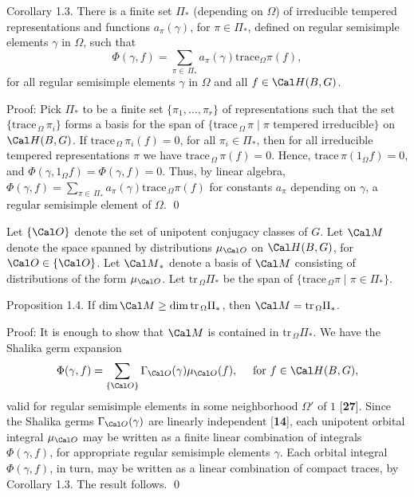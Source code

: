 \proclaim Corollary {1.3}.
There is a finite set
  $ \Pi_* $ (depending on $\Omega$)
of irreducible tempered representations and functions
  $ a_{\pi} (\gamma) $,
for 
  $ \pi \in \Pi_* $,
defined on regular semisimple elements
  $ \gamma $ 
in
  $ \Omega $,
such that
%
$$
  \Phi (\gamma, f) 
=
   \sum_{\pi \in \, \Pi_*}
  a_{\pi} (\gamma) 
  \text{trace}_\Omega{\pi} (f),
$$
%
for all 
regular semisimple elements $\gamma$ in 
  $ \Omega $
and all 
  $ f \in {\Cal H} (B,G) $.
\finishproclaim

\pproclaim Proof:
Pick $\Pi_*$ to be a finite set 
  $ \{\pi_1, \dots , \pi_r \} $
  of representations
such that the set
  $\{ \text{trace}_{\,\Omega} \, \pi_i \}$
forms a basis for the span of
  $ \{ \text{trace}_{\,\Omega} \, \pi \mid
    \pi \,\, \text{tempered irreducible} \} $
on 
  $ {\Cal H} (B,G) $.
If
  $ \text{trace}_{\,\Omega} \, \pi_i (f) = 0 $, for all $\pi_i\in\Pi_*$,
then for all irreducible tempered representations $\pi$ we have
  $ \text{trace}_{\,\Omega} \, \pi (f) = 0 $.
Hence,
  $ \text{trace} \, \pi (1_{\Omega} f) = 0 $,
and
  $ \Phi (\gamma, 1_{\Omega} f) = 
    \Phi (\gamma, f) = 0 $.
Thus, by linear algebra,
  $ \Phi (\gamma,f) = 
    \sum_{\pi \in \,\Pi_*} 
    a_{\pi} (\gamma) \text{trace}_{\,\Omega}\pi(f) $
for constants
  $ a_{\pi} $
depending on
  $ \gamma$, a regular
  semisimple element of $\Omega$.
\qed
\finishpproclaim

Let 
  $ \{ \Cal O \} $
denote the set of unipotent conjugacy classes of $G$.
Let 
  $ \Cal M $
denote the space spanned by distributions
  $ \mu_{\Cal O} $ 
on
  $ {\Cal H} (B,G) $,
  for
  $ \Cal O \in \{ \Cal O \} $.
Let 
  $ {\Cal M}_* $
denote a basis of
  ${\Cal M}$
consisting of distributions of the form
  $ \mu_{\Cal O} $.
Let
  $\text{tr}_{\,\Omega}\Pi_*$
be the span of 
  $ \{ \text{trace}_{\,\Omega} \pi \mid \pi
     \in \Pi_* \} $.

\proclaim Proposition {1.4}.
If 
  $ \dim {\Cal M} \geq \dim \text{tr}_{\,\Omega}\Pi_*$,
then
  $ {\Cal M} = \text{tr}_{\,\Omega}\Pi_*$.
\finishproclaim

\pproclaim Proof:
It is enough to show that ${\Cal M}$ is contained in $\text{tr}_{\,\Omega}\Pi_*$.
We have the Shalika germ expansion
$$\Phi(\gamma,f) = \sum_{\{{\Cal O}\}}\Gamma_{\Cal O}(\gamma)\mu_{\Cal O}(f),
	\quad \text { for } f\in {\Cal H}(B,G),$$
valid for regular semisimple elements in some neighborhood 
$\Omega'$ of $1$ [{\bf 27}].   Since the Shalika germs
$\Gamma_{\Cal O}(\gamma)$ are linearly independent [{\bf 14}],
each unipotent orbital integral $\mu_{\Cal O}$ may be written
as a finite linear combination of integrals $\Phi(\gamma,f)$,
for appropriate regular semisimple elements $\gamma$.  Each
orbital integral $\Phi(\gamma,f)$, in turn, may be written
as a linear combination of compact traces, by Corollary 1.3.
The result follows.
\qed
\finishpproclaim

